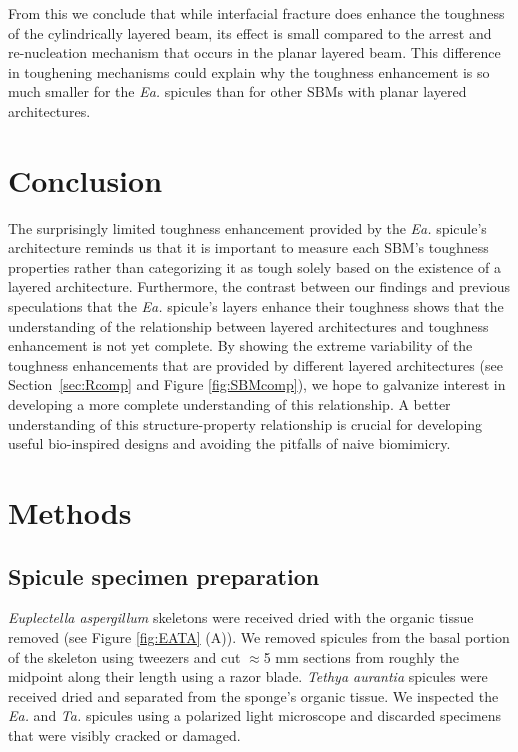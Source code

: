 \documentclass[12pt,onecolumn]{article}
\makeatletter
\newcommand{\TA}{\textit{Ta.\@}\xspace}
\newcommand{\EA}{\textit{Ea.\@}\xspace}
\makeatother
\begin{document}
\begin{bibunit}
From this we conclude that while interfacial fracture does enhance the toughness of the cylindrically layered beam, its effect is small compared to the arrest and re-nucleation mechanism that occurs in the planar layered beam. This difference in toughening mechanisms could explain why the toughness enhancement is so much smaller for the \EA spicules than for other SBMs with planar layered architectures.
	
\section{Conclusion}
The surprisingly limited toughness enhancement provided by the \EA spicule's architecture reminds us that it is important to measure each SBM's toughness properties rather than categorizing it as tough solely based on the existence of a layered architecture. Furthermore, the contrast between our findings and previous speculations that the \EA spicule's layers enhance their toughness shows that the understanding of the relationship between layered architectures and toughness enhancement is not yet complete. By showing the extreme variability of the toughness enhancements that are provided by different layered architectures (see Section~\ref{sec:Rcomp} and Figure \ref{fig:SBMcomp}), we hope to galvanize interest in developing a more complete understanding of this relationship. A better understanding of this structure-property relationship is crucial for developing useful bio-inspired designs and avoiding the pitfalls of naive biomimicry.

\section{Methods}
\label{sec:methods}

\subsection{Spicule specimen preparation}
\label{sec:sampleprep}
\textit{Euplectella aspergillum} skeletons were received dried with the organic tissue removed (see Figure \ref{fig:EATA} (A)). We removed spicules from the basal portion of the skeleton using tweezers and cut $\approx$5 mm sections from roughly the midpoint along their length using a razor blade. \textit{Tethya aurantia} spicules were received dried and separated from the sponge's organic tissue. We inspected the \EA and \TA spicules using a polarized light microscope and discarded specimens that were visibly cracked or damaged.


\end{bibunit}
\end{document}
